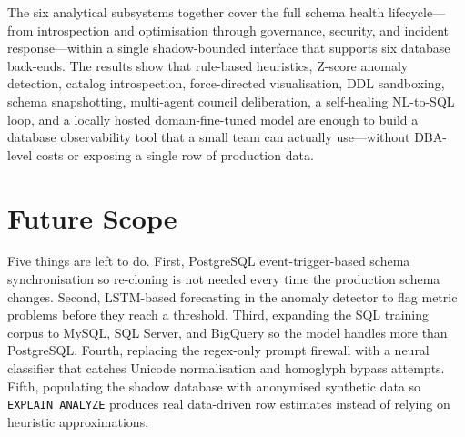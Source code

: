 \documentclass[12pt,a4paper]{report}
\begin{document}
The six analytical subsystems together cover the full schema health lifecycle---from introspection and optimisation through governance, security, and incident response---within a single shadow-bounded interface that supports six database back-ends. The results show that rule-based heuristics, Z-score anomaly detection, catalog introspection, force-directed visualisation, DDL sandboxing, schema snapshotting, multi-agent council deliberation, a self-healing NL-to-SQL loop, and a locally hosted domain-fine-tuned model are enough to build a database observability tool that a small team can actually use---without DBA-level costs or exposing a single row of production data.

\section{Future Scope}

Five things are left to do. First, PostgreSQL event-trigger-based schema synchronisation so re-cloning is not needed every time the production schema changes. Second, LSTM-based forecasting in the anomaly detector to flag metric problems before they reach a threshold. Third, expanding the SQL training corpus to MySQL, SQL Server, and BigQuery so the model handles more than PostgreSQL. Fourth, replacing the regex-only prompt firewall with a neural classifier that catches Unicode normalisation and homoglyph bypass attempts. Fifth, populating the shadow database with anonymised synthetic data so \texttt{EXPLAIN ANALYZE} produces real data-driven row estimates instead of relying on heuristic approximations.
\end{document}
